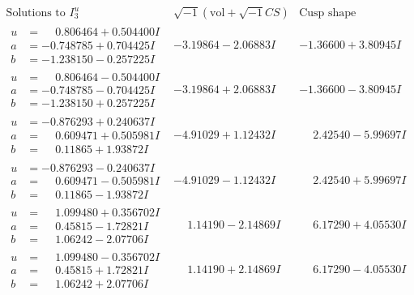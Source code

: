 \documentclass[1p]{elsarticle_modified}
\theoremstyle{definition}
\newcommand{\I}{\sqrt{-1}}
\begin{document}
$$\begin{array}{c|c|c}  
\text{Solutions to }I^u_{3}& \I (\text{vol} + \sqrt{-1}CS) & \text{Cusp shape}\\
 \hline 
\begin{aligned}
u &= \phantom{-}0.806464 + 0.504400 I \\
a &= -0.748785 + 0.704425 I \\
b &= -1.238150 - 0.257225 I\end{aligned}
 & -3.19864 - 2.06883 I & -1.36600 + 3.80945 I \\ \hline\begin{aligned}
u &= \phantom{-}0.806464 - 0.504400 I \\
a &= -0.748785 - 0.704425 I \\
b &= -1.238150 + 0.257225 I\end{aligned}
 & -3.19864 + 2.06883 I & -1.36600 - 3.80945 I \\ \hline\begin{aligned}
u &= -0.876293 + 0.240637 I \\
a &= \phantom{-}0.609471 + 0.505981 I \\
b &= \phantom{-}0.11865 + 1.93872 I\end{aligned}
 & -4.91029 + 1.12432 I & \phantom{-}2.42540 - 5.99697 I \\ \hline\begin{aligned}
u &= -0.876293 - 0.240637 I \\
a &= \phantom{-}0.609471 - 0.505981 I \\
b &= \phantom{-}0.11865 - 1.93872 I\end{aligned}
 & -4.91029 - 1.12432 I & \phantom{-}2.42540 + 5.99697 I \\ \hline\begin{aligned}
u &= \phantom{-}1.099480 + 0.356702 I \\
a &= \phantom{-}0.45815 - 1.72821 I \\
b &= \phantom{-}1.06242 - 2.07706 I\end{aligned}
 & \phantom{-}1.14190 - 2.14869 I & \phantom{-}6.17290 + 4.05530 I \\ \hline\begin{aligned}
u &= \phantom{-}1.099480 - 0.356702 I \\
a &= \phantom{-}0.45815 + 1.72821 I \\
b &= \phantom{-}1.06242 + 2.07706 I\end{aligned}
 & \phantom{-}1.14190 + 2.14869 I & \phantom{-}6.17290 - 4.05530 I \\ \hline\begin{aligned}

\end{aligned}
\end{array}$$
\end{document}
